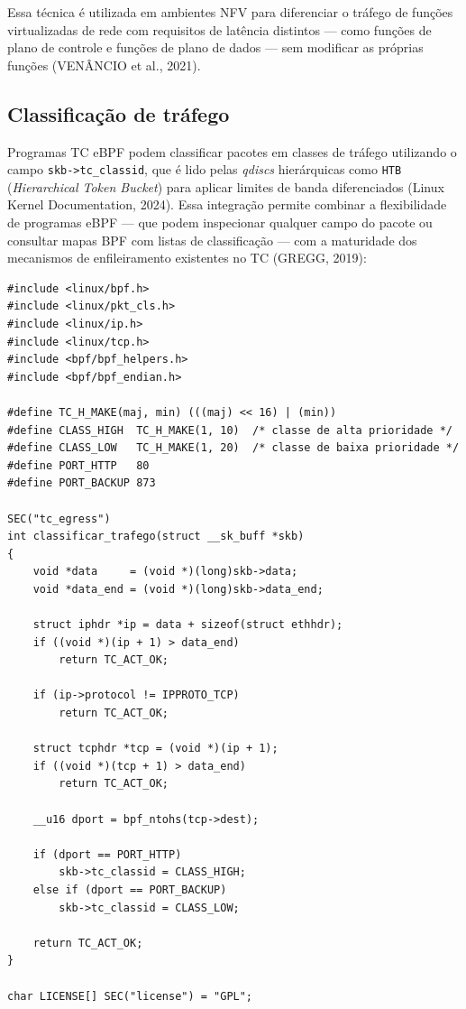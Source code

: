 Essa técnica é utilizada em ambientes NFV para diferenciar o tráfego de funções
virtualizadas de rede com requisitos de latência distintos — como funções de plano de
controle e funções de plano de dados — sem modificar as próprias funções (VENÂNCIO et
al., 2021).

\subsection*{Classificação de tráfego}

Programas TC eBPF podem classificar pacotes em classes de tráfego utilizando o
campo \texttt{skb->tc\_classid}, que é lido pelas \textit{qdiscs} hierárquicas como
\texttt{HTB} (\textit{Hierarchical Token Bucket}) para aplicar limites de banda
diferenciados (Linux Kernel Documentation, 2024). Essa integração permite combinar
a flexibilidade de programas eBPF — que podem inspecionar qualquer campo do pacote ou
consultar mapas BPF com listas de classificação — com a maturidade dos mecanismos de
enfileiramento existentes no TC (GREGG, 2019):

\begin{lstlisting}[caption={Classificação de pacotes por porta de destino para HTB.}, label=lst:tc-classify]
#include <linux/bpf.h>
#include <linux/pkt_cls.h>
#include <linux/ip.h>
#include <linux/tcp.h>
#include <bpf/bpf_helpers.h>
#include <bpf/bpf_endian.h>

#define TC_H_MAKE(maj, min) (((maj) << 16) | (min))
#define CLASS_HIGH  TC_H_MAKE(1, 10)  /* classe de alta prioridade */
#define CLASS_LOW   TC_H_MAKE(1, 20)  /* classe de baixa prioridade */
#define PORT_HTTP   80
#define PORT_BACKUP 873

SEC("tc_egress")
int classificar_trafego(struct __sk_buff *skb)
{
    void *data     = (void *)(long)skb->data;
    void *data_end = (void *)(long)skb->data_end;

    struct iphdr *ip = data + sizeof(struct ethhdr);
    if ((void *)(ip + 1) > data_end)
        return TC_ACT_OK;

    if (ip->protocol != IPPROTO_TCP)
        return TC_ACT_OK;

    struct tcphdr *tcp = (void *)(ip + 1);
    if ((void *)(tcp + 1) > data_end)
        return TC_ACT_OK;

    __u16 dport = bpf_ntohs(tcp->dest);

    if (dport == PORT_HTTP)
        skb->tc_classid = CLASS_HIGH;
    else if (dport == PORT_BACKUP)
        skb->tc_classid = CLASS_LOW;

    return TC_ACT_OK;
}

char LICENSE[] SEC("license") = "GPL";
\end{lstlisting}

